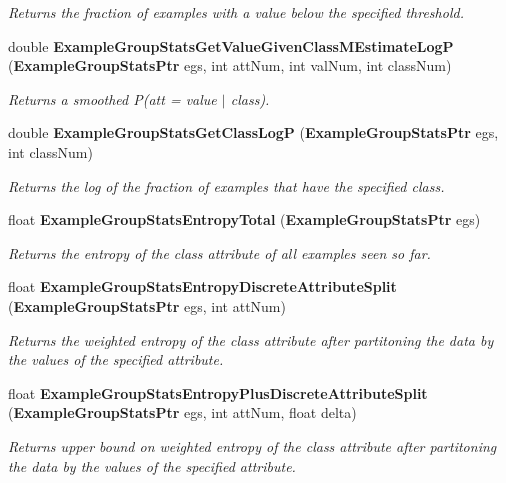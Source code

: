 \begin{CompactItemize}
\begin{CompactList}\small\item\em Returns the fraction of examples with a value below the specified threshold. \item\end{CompactList}\item 
double {\bf Example\-Group\-Stats\-Get\-Value\-Given\-Class\-MEstimate\-Log\-P} ({\bf Example\-Group\-Stats\-Ptr} egs, int att\-Num, int val\-Num, int class\-Num)
\begin{CompactList}\small\item\em Returns a smoothed P(att = value $|$ class). \item\end{CompactList}\item 
double {\bf Example\-Group\-Stats\-Get\-Class\-Log\-P} ({\bf Example\-Group\-Stats\-Ptr} egs, int class\-Num)
\begin{CompactList}\small\item\em Returns the log of the fraction of examples that have the specified class. \item\end{CompactList}\item 
float {\bf Example\-Group\-Stats\-Entropy\-Total} ({\bf Example\-Group\-Stats\-Ptr} egs)
\begin{CompactList}\small\item\em Returns the entropy of the class attribute of all examples seen so far. \item\end{CompactList}\item 
float {\bf Example\-Group\-Stats\-Entropy\-Discrete\-Attribute\-Split} ({\bf Example\-Group\-Stats\-Ptr} egs, int att\-Num)
\begin{CompactList}\small\item\em Returns the weighted entropy of the class attribute after partitoning the data by the values of the specified attribute. \item\end{CompactList}\item 
float {\bf Example\-Group\-Stats\-Entropy\-Plus\-Discrete\-Attribute\-Split} ({\bf Example\-Group\-Stats\-Ptr} egs, int att\-Num, float delta)
\begin{CompactList}\small\item\em Returns upper bound on weighted entropy of the class attribute after partitoning the data by the values of the specified attribute. \item\end{CompactList}\item 

\end{CompactItemize}
